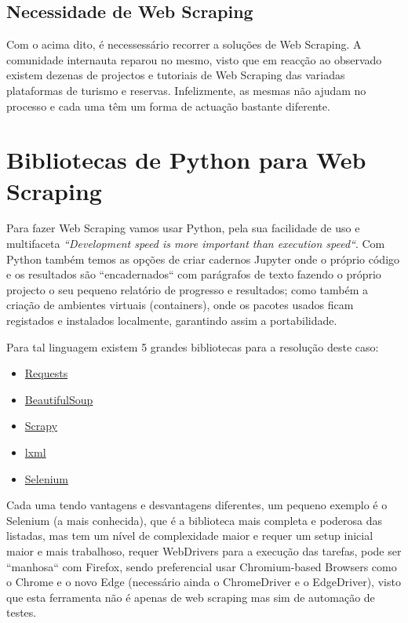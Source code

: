 \documentclass[a4paper,10pt]{article}
\begin{document}
\subsection{Necessidade de Web Scraping}

Com o acima dito, é necessessário recorrer a soluções de Web Scraping.
A comunidade internauta reparou no mesmo, visto que em reacção ao observado existem dezenas de projectos e tutoriais de Web Scraping das variadas plataformas de turismo e reservas.
Infelizmente, as mesmas não ajudam no processo e cada uma têm um forma de actuação bastante diferente.

\section{Bibliotecas de Python para Web Scraping}

Para fazer Web Scraping vamos usar Python, pela sua facilidade de uso e multifaceta \textit{``Development speed is more important than execution speed``}.
Com Python também temos as opções de criar cadernos Jupyter onde o próprio código e os resultados são ``encadernados`` com parágrafos de texto fazendo o próprio projecto o seu pequeno relatório de progresso e resultados; como também a criação de ambientes virtuais (containers), onde os pacotes usados ficam registados e instalados localmente, garantindo assim a portabilidade.

Para tal linguagem existem 5 grandes bibliotecas para a resolução deste caso:
\begin{itemize}
    \item \href{https://pypi.org/project/requests/}{Requests}
    \item \href{https://pypi.org/project/BeautifulSoup/}{BeautifulSoup}
    \item \href{https://pypi.org/project/Scrapy3/}{Scrapy}
    \item \href{https://pypi.org/project/lxml/}{lxml}
    \item \href{https://pypi.org/project/selenium/}{Selenium}
\end{itemize}

Cada uma tendo vantagens e desvantagens diferentes, um pequeno exemplo é o Selenium (a mais conhecida), que é a biblioteca mais completa e poderosa das listadas, mas tem um nível de complexidade maior e requer um setup inicial maior e mais trabalhoso, requer WebDrivers para a execução das tarefas, pode ser ``manhosa`` com Firefox, sendo preferencial usar Chromium-based Browsers como o Chrome e o novo Edge (necessário ainda o ChromeDriver e o EdgeDriver), visto que esta ferramenta não é apenas de web scraping mas sim de automação de testes.
\end{document}
